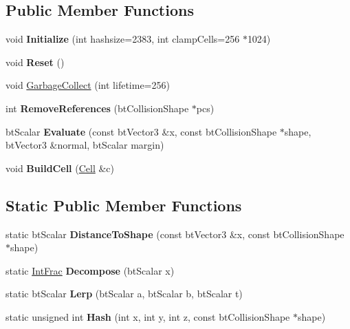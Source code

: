 \subsection*{Public Member Functions}
\begin{DoxyCompactItemize}
\item 
\mbox{\label{structbtSparseSdf_afe91a2239636a83c17b9ae57034a9d2f}} 
void {\bfseries Initialize} (int hashsize=2383, int clamp\+Cells=256 $\ast$1024)
\item 
\mbox{\label{structbtSparseSdf_a2f650f4de0d04f74ee7cf17cf598ea24}} 
void {\bfseries Reset} ()
\item 
void \hyperlink{structbtSparseSdf_a08dbaa356f577ebbd0808329766111d1}{Garbage\+Collect} (int lifetime=256)
\item 
\mbox{\label{structbtSparseSdf_a83c76728ac778112b4c1c2fb82ba4477}} 
int {\bfseries Remove\+References} (bt\+Collision\+Shape $\ast$pcs)
\item 
\mbox{\label{structbtSparseSdf_a9e16c04bb8321538b9b79d426a251096}} 
bt\+Scalar {\bfseries Evaluate} (const bt\+Vector3 \&x, const bt\+Collision\+Shape $\ast$shape, bt\+Vector3 \&normal, bt\+Scalar margin)
\item 
\mbox{\label{structbtSparseSdf_ac91f0a240d638c6c69c900d6995e6eb8}} 
void {\bfseries Build\+Cell} (\hyperlink{structbtSparseSdf_1_1Cell}{Cell} \&c)
\end{DoxyCompactItemize}
\subsection*{Static Public Member Functions}
\begin{DoxyCompactItemize}
\item 
\mbox{\label{structbtSparseSdf_a5bb4cb1c91f3f7a94f8924a87526c18c}} 
static bt\+Scalar {\bfseries Distance\+To\+Shape} (const bt\+Vector3 \&x, const bt\+Collision\+Shape $\ast$shape)
\item 
\mbox{\label{structbtSparseSdf_a2f1d693d445c2d3c9cebe86f1fc440a6}} 
static \hyperlink{structbtSparseSdf_1_1IntFrac}{Int\+Frac} {\bfseries Decompose} (bt\+Scalar x)
\item 
\mbox{\label{structbtSparseSdf_acf8197387b8c7737dab9e79d40aa2355}} 
static bt\+Scalar {\bfseries Lerp} (bt\+Scalar a, bt\+Scalar b, bt\+Scalar t)
\item 
\mbox{\label{structbtSparseSdf_ad1595c6fc8c7913b34d81d53af508656}} 
static unsigned int {\bfseries Hash} (int x, int y, int z, const bt\+Collision\+Shape $\ast$shape)
\end{DoxyCompactItemize}
